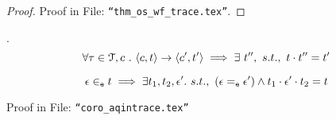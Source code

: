 \begin{proof}
Proof in File: {\tt ``thm\_os\_wf\_trace.tex''}.
% 
\end{proof}
%
\begin{lem}
.
\\
$$
\forall \mathtt{\tau} \in \mathcal{T}, c ~.~
\langle c, t \rangle 
\rightarrow
\langle c', t' \rangle \implies \exists ~ t'', ~ s.t., ~ t \cdot t'' = t'
$$
\end{lem}
%
\begin{coro}
\label{coro:aqintrace}
\[
\mathtt{\epsilon} \in_{\mathtt{e}} t \implies \exists t_1, t_2, \mathtt{\epsilon}'. ~ s.t., ~ (\mathtt{\epsilon} =_{\mathtt{e}} \mathtt{\epsilon}') \land t_1 \cdot \mathtt{\epsilon}' \cdot t_2 = t  
\]
\end{coro}
\begin{subproof}
Proof in File: {\tt ``coro\_aqintrace.tex''}
% 
%
\end{subproof}
%
%
%
%
%

%
%
%
%
%
%
%
% 
%
\clearpage